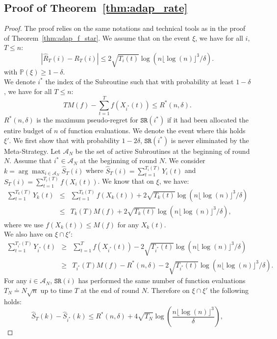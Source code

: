 \documentclass[final,12pt]{colt2018}
\newcommand{\floor}[1]{\lfloor #1 \rfloor}
\begin{document}
\subsection{Proof of Theorem~\ref{thm:adap_rate}}
\begin{proof}
The proof relies on the same notations and technical tools as in the proof of Theorem~\ref{thm:adap_f_star}. We assume that on the event $\xi$, we have for all $i$, $T \leq n$: 
$$
|\widehat{R}_T(i) - R_T(i)| \leq 2\sqrt{T_i(t)}\log(n\floor{\log(n)}^3/\delta).
$$ 
with $\mathbb P(\xi) \geq 1-\delta$.\\
We denote $i^*$ the index of the Subroutine such that with probability at least $1-\delta$, we have for all $T \leq n$:
$$
TM(f) - \sum_{t=1}^T f(X_{i^*}(t)) \leq R^*(n,\delta).
$$
$R^*(n,\delta)$ is the maximum pseudo-regret for $\texttt{SR}(i^*)$ if it had been allocated the entire budget of $n$ of function evaluations. We denote the event where this holds $\xi'$.
We first show that with probability $1-2\delta$, $\texttt{SR}(i^*)$ is never eliminated by the Meta-Strategy. Let $\mathcal A_N$ be the set of active Subroutines at the beginning of round $N$. Assume that $i^* \in \mathcal A_N$ at the beginning of round $N$. We consider $k = \arg\max_{i \in \mathcal A_N} \widehat S_T(i)$ where $\widehat S_T(i) = \sum_{t=1}^{T_i(T)} Y_i(t)$ and $S_T(i) = \sum_{t=1}^{T_i(T)} f(X_i(t))$. We know that on $\xi$, we have:
\begin{eqnarray*}
\sum_{t=1}^{T_k(T)} Y_k(t) & \leq & \sum_{t=1}^{T_k(T)} f(X_k(t)) + 2\sqrt{T_k(t)}\log(n\floor{\log(n)}^3/\delta)\\
& \leq & T_k(T)M(f) + 2\sqrt{T_k(t)}\log(n\floor{\log(n)}^3/\delta),
\end{eqnarray*}
where we use $f(X_k(t)) \leq M(f)$ for any $X_k(t)$.\\
We also have on $\xi \cap \xi'$:
\begin{eqnarray*}
\sum_{t=1}^{T_{i^*}(T)} Y_{i^*}(t) & \geq & \sum_{t=1}^T f(X_{i^*}(t)) - 2\sqrt{T_{i^*}(t)}\log(n\floor{\log(n)}^3/\delta)\\
& \geq & T_{i^*}(T)M(f) - R^*(n,\delta) - 2\sqrt{T_{i^*}(t)}\log(n\floor{\log(n)}^3/\delta).
\end{eqnarray*}
For any $i \in \mathcal A_N$, $\texttt{SR}(i)$ has performed the same number of function evaluations $T_N \doteq N\sqrt{n}$ up to time $T$ at the end of round $N$. Therefore on $\xi \cap \xi'$ the following holds:
$$
\widehat S_T(k)- \widehat S_{i^*}(k) \leq R^*(n,\delta) + 4\sqrt{T_N}\log\left(\frac{n\floor{\log(n)}^3}{\delta}\right),
$$
\end{proof}
\end{document}

